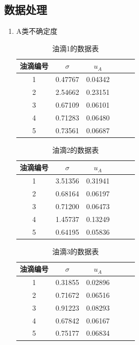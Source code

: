 \documentclass[12pt,a4paper,UTF8]{ctexart}
\begin{document}
\subsection*{数据处理}
\begin{enumerate}
\item A类不确定度
	\begin{table}[htbp]
  \centering
  \begin{tabular}{cccccc}
    \toprule
    油滴编号 & $\sigma$  & $u_{A}$ \\
    \midrule
    1 &0.47767 &0.04342  \\
    2 &2.54662 &0.23151  \\
    3 &0.67109 &0.06101  \\
    4 &0.71283 &0.06480  \\
    5 &0.73561 &0.06687  \\
    \bottomrule
  \end{tabular}
  \caption{油滴1的数据表}
  \label{tab:data}
\end{table}

\begin{table}[htbp]
  \centering
  \begin{tabular}{cccccc}
    \toprule
    油滴编号 & $\sigma$  & $u_{A}$ \\
    \midrule
    1 &3.51356 &0.31941  \\
    2 &0.68164 &0.06197 \\
    3 &0.71200 &0.06473  \\
    4 &1.45737 &0.13249  \\
    5 &0.64195 &0.05836  \\
    \bottomrule
  \end{tabular}
  \caption{油滴2的数据表}
  \label{tab:data}
\end{table}

\begin{table}[htbp]
  \centering
  \begin{tabular}{cccccc}
    \toprule
    油滴编号 & $\sigma$  & $u_{A}$ \\
    \midrule
    1 &0.31855 &0.02896  \\
    2 &0.71672 &0.06516 \\
    3 &0.91223 &0.08293  \\
    4 &0.67842 &0.06167  \\
    5 &0.75177 &0.06834  \\
    \bottomrule
  \end{tabular}
  \caption{油滴3的数据表}
  \label{tab:data}
\end{table}

\end{enumerate}
\end{document}
